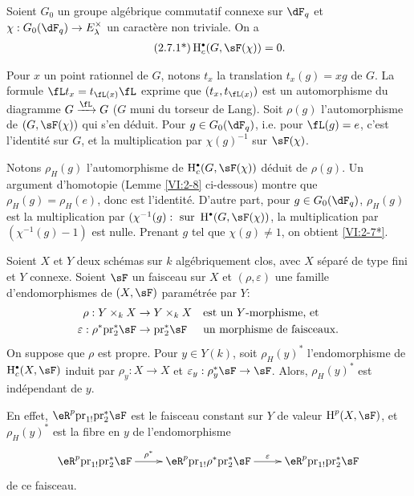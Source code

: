 \begin{theorem*}[2.7*]\label{VI:2-7*}
Soient $G_0$ un groupe algébrique commutatif connexe sur $\dF_q$ et 
$\chi:G_0(\dF_q) \to E_\lambda^\times$ un caractère non triviale. On a 
\begin{align*}\tag{2.7.1*}\label{VI:eq:2-7-1*}
  \h_c^\bullet(G,\sF(\chi)) = 0 \text{.}
\end{align*}
\end{theorem*}

Pour $x$ un point rationnel de $G$, notons $t_x$ la translation $t_x(g) = x g$ 
de $G$. La formule $\fL t_x = t_{\fL(x)} \fL$ exprime que $(t_x,t_{\fL(x)})$ 
est un automorphisme du diagramme $G\xrightarrow\fL G$ ($G$ muni du torseur de 
Lang). Soit $\rho(g)$ l'automorphisme de $(G,\sF(\chi))$ qui s'en déduit. 
Pour $g\in G_0(\dF_q)$, i.e. pour $\fL(g) = e$, c'est l'identité sur $G$, et 
la multiplication par $\chi(g)^{-1}$ sur $\sF(\chi)$. 

Notons $\rho_H(g)$ l'automorphisme de $\h_c^\bullet(G,\sF(\chi))$ déduit de 
$\rho(g)$. Un argument d'homotopie (Lemme \ref{VI:2-8} ci-dessous) montre que 
$\rho_H(g) = \rho_H(e)$, donc est l'identité. D'autre part, pour 
$g\in G_0(\dF_q)$, $\rho_H(g)$ est la multiplication par 
$(\chi^{-1}(g):\text{ sur }\h^\bullet(G,\sF(\chi))$, la multiplication par 
$(\chi^{-1}(g)-1)$ est nulle. Prenant $g$ tel que $\chi(g)\ne 1$, on obtient 
\ref{VI:2-7*}. 





\begin{lemma_}\label{VI:2-8}
Soient $X$ et $Y$ deux schémas sur $k$ algébriquement clos, avec $X$ 
séparé de type fini et $Y$ connexe. Soient $\sF$ un faisceau sur $X$ et 
$(\rho,\varepsilon)$ une famille d'endomorphismes de $(X,\sF)$ paramétrée 
par $Y$: 
\begin{align*} 
  \rho:Y\times_k X &\to Y\times_k X && \text{est un $Y$-morphisme, et} \\
  \varepsilon:\rho^\ast \pr_2^\ast \sF &\to \pr_2^\ast\sF && \text{un morphisme de faisceaux.} 
\end{align*}
On suppose que $\rho$ est propre. Pour $y\in Y(k)$, soit $\rho_H(y)^\ast$ 
l'endomorphisme de $\h_c^\bullet(X,\sF)$ induit par $\rho_y:X\to X$ et 
$\varepsilon_y:\rho_y^\ast\sF\to \sF$. Alors, $\rho_H(y)^\ast$ est 
indépendant de $y$. 
\end{lemma_}

En effet, $\eR^p \pr_{1!} \pr_2^\ast\sF$ est le 
faisceau constant sur $Y$ de valeur $\h^p(X,\sF)$, et $\rho_H(y)^\ast$ est la 
fibre en $y$ de l'endomorphisme 
\[\xymatrix{
  \eR^p \pr_{1!} \pr_2^\ast \sF \ar[r]^-{\rho^\ast} 
    & \eR^p \pr_{1!} \rho^\ast \pr_2^\ast \sF \ar[r]^-\varepsilon 
    & \eR^p \pr_{1!} \pr_2^\ast \sF 
}\]
de ce faisceau. 





